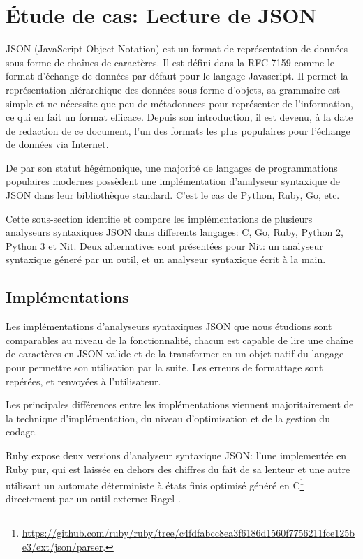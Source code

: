 \section{Étude de cas: Lecture de JSON}\label{json_perf}

JSON (JavaScript Object Notation) est un format de représentation de données
sous forme de chaînes de caractères.
Il est défini dans la RFC 7159 \cite{bray2014javascript} comme le format d'échange de
données par défaut pour le langage Javascript.
Il permet la représentation hiérarchique des données sous forme d'objets, sa grammaire
est simple et ne nécessite que peu de métadonnees pour représenter de l'information,
ce qui en fait un format efficace.
Depuis son introduction, il est devenu, à la date de redaction de ce document, l'un
des formats les plus populaires pour l'échange de données via Internet\cite{wang2011improving}.

De par son statut hégémonique, une majorité de langages de programmations populaires
modernes possèdent une implémentation d'analyseur syntaxique de JSON dans leur bibliothèque
standard. C'est le cas de Python, Ruby, Go, etc.

Cette sous-section identifie et compare les implémentations de plusieurs analyseurs syntaxiques
JSON dans differents langages: C, Go, Ruby, Python 2, Python 3 et Nit.
Deux alternatives sont présentées pour Nit: un analyseur syntaxique géneré par un outil, et un analyseur
syntaxique écrit à la main.

\subsection{Implémentations}

Les implémentations d'analyseurs syntaxiques JSON que nous étudions sont comparables au niveau de la
fonctionnalité, chacun est capable de lire une chaîne de caractères en JSON valide et de la
transformer en un objet natif du langage pour permettre son utilisation par la suite.
Les erreurs de formattage sont repérées, et renvoyées à l'utilisateur.

Les principales différences entre les implémentations viennent majoritairement de la
technique d'implémentation, du niveau d'optimisation et de la gestion du codage.

Ruby expose deux versions d'analyseur syntaxique JSON: l'une implementée en Ruby pur, qui est laissée
en dehors des chiffres du fait de sa lenteur et une autre utilisant un automate déterministe
à états finis optimisé généré en C\footnote{
\url{https://github.com/ruby/ruby/tree/c4fdfabcc8ea3f6186d1560f7756211fce125be3/ext/json/parser}.}
directement par un outil externe: Ragel \cite{ragel}.

